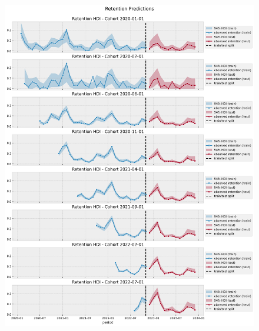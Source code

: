 \documentclass[11pt]{amsart}
\begin{document}
\begin{figure}
    \includegraphics[width=\textwidth]{images/revenue_retention_66_0.png}
\end{figure}
\end{document}
